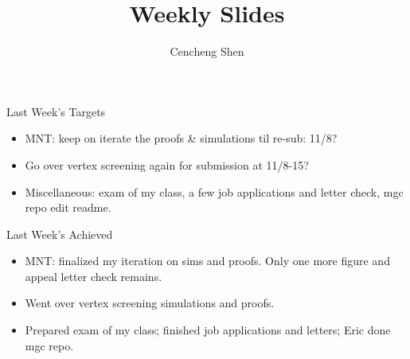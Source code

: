 \documentclass{beamer}
\title[]{Weekly Slides}
\author{Cencheng Shen} %
\institute[] %
{
}
\begin{document}

\begin{frame}
\titlepage %
\end{frame}


\begin{frame}{Last Week's Targets}
\begin{itemize}
\item MNT: keep on iterate the proofs \& simulations til re-sub: 11/8?
\item Go over vertex screening again for submission at 11/8-15?
\item Miscellaneous: exam of my class, a few job applications and letter check, mgc repo edit readme. 
\end{itemize}
\end{frame}

\begin{frame}{Last Week's Achieved}
\begin{itemize}
\item MNT: finalized my iteration on sims and proofs. Only one more figure and appeal letter check remains.
\item Went over vertex screening simulations and proofs.
\item Prepared exam of my class; finished job applications and letters; Eric done mgc repo. 
\end{itemize}
\end{frame}
\end{document}
